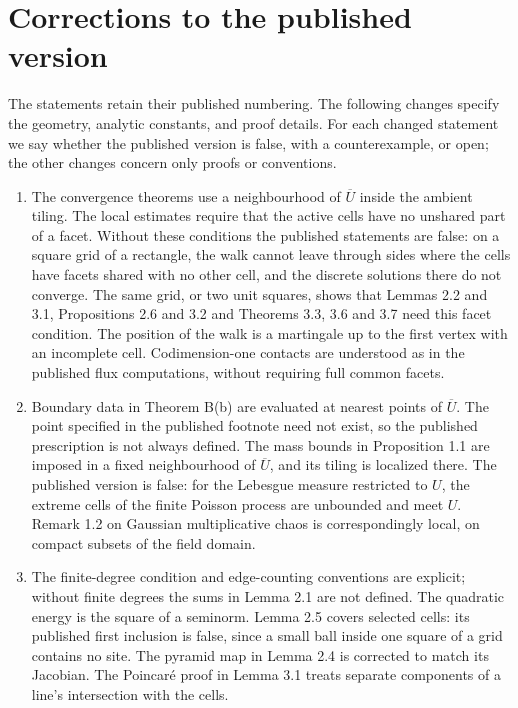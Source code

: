 \documentclass[12pt]{amsart}
\numberwithin{equation}{section}
\begin{document}
\section*{Corrections to the published version}
The statements retain their published numbering. The following changes specify the geometry, analytic constants, and proof details. For each changed statement we say whether the published version is false, with a counterexample, or open; the other changes concern only proofs or conventions.
\begin{enumerate}
\item The convergence theorems use a neighbourhood of $\overline U$ inside the ambient tiling. The local estimates require that the active cells have no unshared part of a facet. Without these conditions the published statements are false: on a square grid of a rectangle, the walk cannot leave through sides where the cells have facets shared with no other cell, and the discrete solutions there do not converge. The same grid, or two unit squares, shows that Lemmas 2.2 and 3.1, Propositions 2.6 and 3.2 and Theorems 3.3, 3.6 and 3.7 need this facet condition. The position of the walk is a martingale up to the first vertex with an incomplete cell. Codimension-one contacts are understood as in the published flux computations, without requiring full common facets.
\item Boundary data in Theorem B(b) are evaluated at nearest points of $\overline U$. The point specified in the published footnote need not exist, so the published prescription is not always defined. The mass bounds in Proposition 1.1 are imposed in a fixed neighbourhood of $\overline U$, and its tiling is localized there. The published version is false: for the Lebesgue measure restricted to $U$, the extreme cells of the finite Poisson process are unbounded and meet $U$. Remark 1.2 on Gaussian multiplicative chaos is correspondingly local, on compact subsets of the field domain.
\item The finite-degree condition and edge-counting conventions are explicit; without finite degrees the sums in Lemma 2.1 are not defined. The quadratic energy is the square of a seminorm. Lemma 2.5 covers selected cells: its published first inclusion is false, since a small ball inside one square of a grid contains no site. The pyramid map in Lemma 2.4 is corrected to match its Jacobian. The Poincar\'e proof in Lemma 3.1 treats separate components of a line's intersection with the cells.

\end{enumerate}
\end{document}
